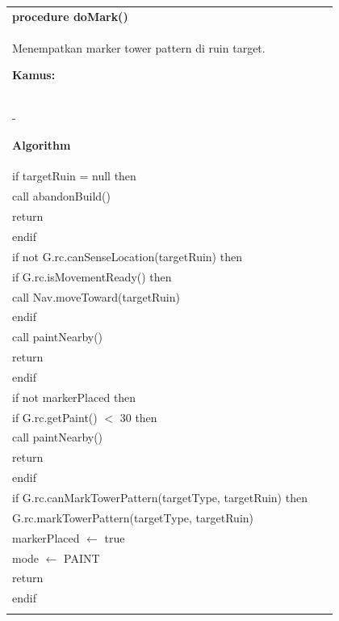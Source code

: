 \documentclass{article}
\newenvironment{pseudobox}
{
\centering
\begin{longtable}{|p{0.94\linewidth}|}
\hline
}
{
\\ \hline
\end{longtable}
\vspace{0.05cm}
}
\begin{document}
\begin{pseudobox}
\textbf{procedure doMark()} \\
{ Menempatkan marker tower pattern di ruin target. }

\textbf{Kamus:} \\
\hspace*{1em} -

\textbf{Algorithm} \\
\hspace*{1em} if targetRuin = null then \\
\hspace*{2em} call abandonBuild() \\
\hspace*{2em} return \\
\hspace*{1em} endif \\

\hspace*{1em} if not G.rc.canSenseLocation(targetRuin) then \\
\hspace*{2em} if G.rc.isMovementReady() then \\
\hspace*{3em} call Nav.moveToward(targetRuin) \\
\hspace*{2em} endif \\
\hspace*{2em} call paintNearby() \\
\hspace*{2em} return \\
\hspace*{1em} endif \\

\hspace*{1em} if not markerPlaced then \\
\hspace*{2em} if G.rc.getPaint() $<$ 30 then \\
\hspace*{3em} call paintNearby() \\
\hspace*{3em} return \\
\hspace*{2em} endif \\

\hspace*{2em} if G.rc.canMarkTowerPattern(targetType, targetRuin) then \\
\hspace*{3em} G.rc.markTowerPattern(targetType, targetRuin) \\
\hspace*{3em} markerPlaced $\leftarrow$ true \\
\hspace*{3em} mode $\leftarrow$ PAINT \\
\hspace*{3em} return \\
\hspace*{2em} endif \\


\end{pseudobox}
\end{document}

